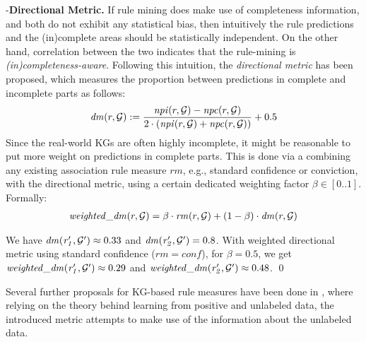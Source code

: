 \noindent -\textbf{Directional Metric.} If rule mining does make use of completeness information, and both do not exhibit any statistical bias, then intuitively the rule predictions and the (in)complete areas should be statistically independent. On the other hand, correlation between the two indicates that the rule-mining is \emph{(in)completeness-aware}. Following this intuition, the \emph{directional metric} has been proposed, which measures the proportion between predictions in complete and incomplete parts as follows:
\begin{align*}
\mathit{dm}(r,\mathcal{G}) := \frac{\mathit{npi}(r,\mathcal{G})-\mathit{npc}(r,\mathcal{G})}{2\cdot(\mathit{npi}(r,\mathcal{G})+\mathit{npc}(r,\mathcal{G}))}+0.5
\end{align*}
Since the real-world KGs are often highly incomplete, it might be reasonable to put more weight on predictions in complete parts. This is done via a %
combining any existing association rule measure $rm$, e.g., standard confidence or conviction, with 
the directional metric, using a certain dedicated weighting factor $\beta \in [0..1]$. Formally:
\begin{align*}
\mathit{weighted\_dm}(r,\mathcal{G})=\beta \cdot \mathit{rm}(r,\mathcal{G}) + (1-\beta) \cdot \mathit{dm}(r,\mathcal{G}) 
\end{align*}
\begin{example}
We have $\mathit{dm(r_1',\mathcal{G}')}\approx 0.33$ and $\mathit{dm(r_2',\mathcal{G}')}=0.8$. With weighted directional metric using standard confidence ($rm = conf$), for $\beta=0.5$, we get $\mathit{weighted\_dm(r_1',\mathcal{G}')} \approx 0.29$ and $\mathit{weighted\_dm(r_2',\mathcal{G}')} \approx 0.48$. \qed
\end{example}

Several further proposals for KG-based rule measures have been done in \cite{DBLP:conf/www/ZupancD18}, where relying on the theory behind learning from positive and unlabeled data, the introduced  metric attempts to make use of the information about the unlabeled data. 

